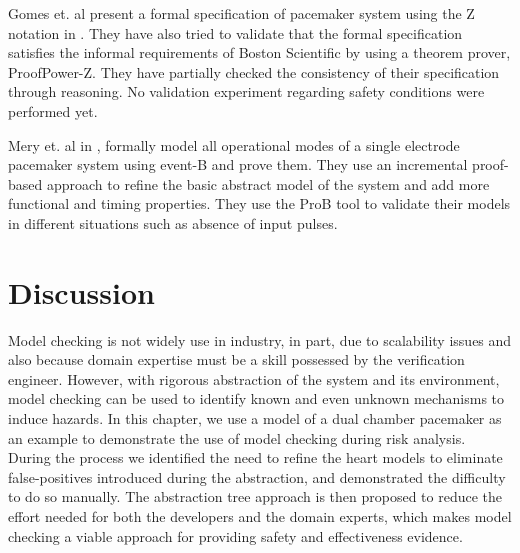 Gomes et. al present a formal specification of pacemaker system using the Z notation in \cite{Gomes}. They have also tried to validate that the formal specification satisfies the informal requirements of Boston Scientific by using a theorem prover, ProofPower-Z. They have partially checked the consistency of their specification through reasoning. No validation experiment regarding safety conditions were performed yet.

Mery et. al in \cite{Mery}, formally model all operational modes of a single electrode pacemaker system using event-B and prove them. They use an incremental proof-based approach to refine the basic abstract model of the system and add more functional and timing properties. They use the ProB tool to validate their models in different situations such as absence of input pulses. \\


\section{Discussion}
Model checking is not widely use in industry, in part, due to scalability issues and also because domain expertise must be a skill possessed by the verification engineer. However, with rigorous abstraction of the system and its environment, model checking can be used to identify 
known and even unknown mechanisms to induce hazards. In this chapter, we use a model of a dual chamber pacemaker as an example to demonstrate the use of model checking during risk analysis. During the process we identified the need to refine the heart models to eliminate false-positives introduced during the abstraction, and demonstrated the difficulty to do so manually. The abstraction tree approach is then proposed to reduce the effort needed for both the developers and the domain experts, which makes model checking a viable approach for providing safety and effectiveness evidence. 
